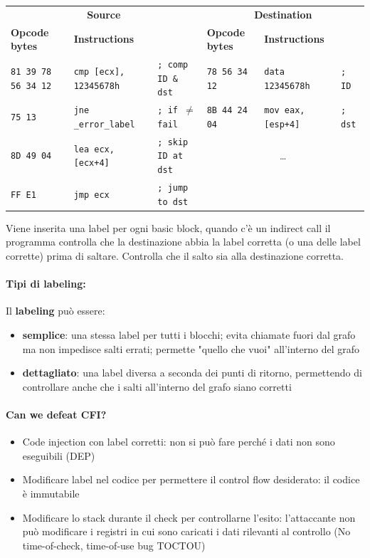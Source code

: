 \begin{table}[h]
	\centering
	\begin{adjustbox}{max width=\textwidth}
	\begin{tabular}{@{} lll | lll @{}}
		\multicolumn{3}{c}{\bfseries Source} & \multicolumn{3}{c}{\bfseries Destination} \\
		\cmidrule(lr){1-3} \cmidrule(l){4-6}
		\bfseries Opcode bytes & \bfseries Instructions &
		& \bfseries Opcode bytes & \bfseries Instructions &\\
		\midrule
		\texttt{81 39 78 56 34 12}
		& \texttt{cmp [ecx],\,12345678h} & \texttt{; comp ID \& dst}
		& \texttt{78 56 34 12} & \texttt{data 12345678h} & \texttt{; ID} \\
		\texttt{75 13}
		& \texttt{jne \_error\_label} & \texttt{; if \(\neq\) fail}
		& \texttt{8B 44 24 04} & \texttt{mov eax, [esp+4]} & \texttt{; dst} \\
		\texttt{8D 49 04}
		& \texttt{lea ecx,[ecx+4]} & \texttt{; skip ID at dst}
		& \multicolumn{3}{c}{\dots} \\
		\texttt{FF E1}
		& \texttt{jmp ecx} & \texttt{; jump to dst}
		& & & \\
	\end{tabular}
	\end{adjustbox}
\end{table}

Viene inserita una label per ogni basic block, quando c'è un indirect call il programma controlla che la destinazione abbia la label corretta (o una delle label corrette) prima di saltare. Controlla che il salto sia alla destinazione corretta.

\paragraph{Tipi di labeling:} Il \textbf{labeling} può essere: 
\begin{itemize}
	\item \textbf{semplice}: una stessa label per tutti i blocchi; evita chiamate fuori dal grafo ma non impedisce salti errati; permette "quello che vuoi" all'interno del grafo
	\item \textbf{dettagliato}: una label diversa a seconda dei punti di ritorno, permettendo di controllare anche che i salti all'interno del grafo siano corretti
\end{itemize}

\paragraph{Can we defeat CFI?}
\begin{itemize}
	\item Code injection con label corretti: non si può fare perché i dati non sono eseguibili (DEP)
	\item Modificare label nel codice per permettere il control flow desiderato: il codice è immutabile
	\item Modificare lo stack durante il check per controllarne l'esito: l'attaccante non può modificare i registri in cui sono caricati i dati rilevanti al controllo (No time-of-check, time-of-use bug TOCTOU)
\end{itemize} 

